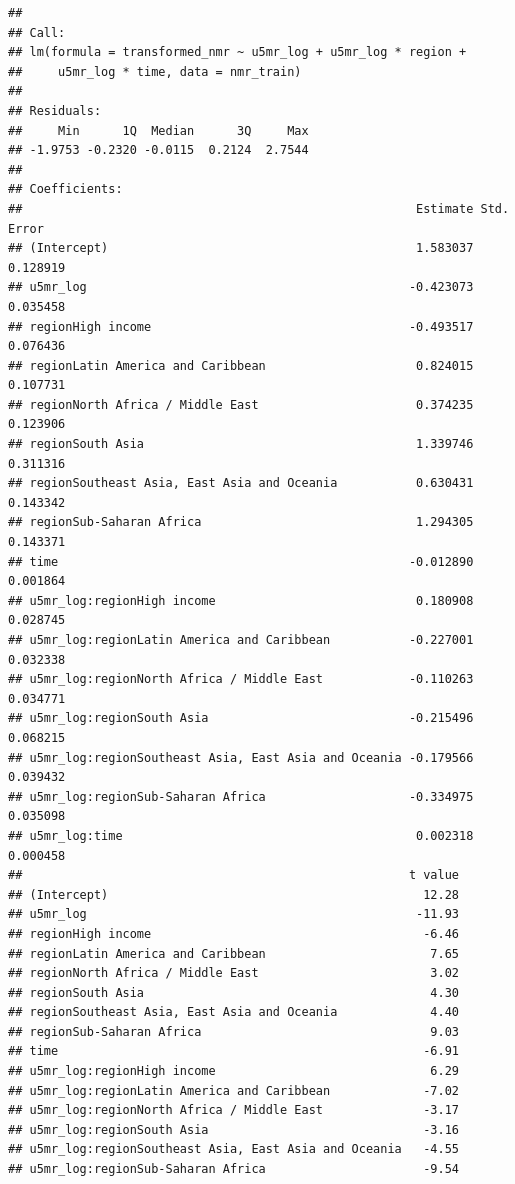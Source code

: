 \documentclass[
]{article}
\begin{document}
\begin{verbatim}
## 
## Call:
## lm(formula = transformed_nmr ~ u5mr_log + u5mr_log * region + 
##     u5mr_log * time, data = nmr_train)
## 
## Residuals:
##     Min      1Q  Median      3Q     Max 
## -1.9753 -0.2320 -0.0115  0.2124  2.7544 
## 
## Coefficients:
##                                                       Estimate Std. Error
## (Intercept)                                           1.583037   0.128919
## u5mr_log                                             -0.423073   0.035458
## regionHigh income                                    -0.493517   0.076436
## regionLatin America and Caribbean                     0.824015   0.107731
## regionNorth Africa / Middle East                      0.374235   0.123906
## regionSouth Asia                                      1.339746   0.311316
## regionSoutheast Asia, East Asia and Oceania           0.630431   0.143342
## regionSub-Saharan Africa                              1.294305   0.143371
## time                                                 -0.012890   0.001864
## u5mr_log:regionHigh income                            0.180908   0.028745
## u5mr_log:regionLatin America and Caribbean           -0.227001   0.032338
## u5mr_log:regionNorth Africa / Middle East            -0.110263   0.034771
## u5mr_log:regionSouth Asia                            -0.215496   0.068215
## u5mr_log:regionSoutheast Asia, East Asia and Oceania -0.179566   0.039432
## u5mr_log:regionSub-Saharan Africa                    -0.334975   0.035098
## u5mr_log:time                                         0.002318   0.000458
##                                                      t value
## (Intercept)                                            12.28
## u5mr_log                                              -11.93
## regionHigh income                                      -6.46
## regionLatin America and Caribbean                       7.65
## regionNorth Africa / Middle East                        3.02
## regionSouth Asia                                        4.30
## regionSoutheast Asia, East Asia and Oceania             4.40
## regionSub-Saharan Africa                                9.03
## time                                                   -6.91
## u5mr_log:regionHigh income                              6.29
## u5mr_log:regionLatin America and Caribbean             -7.02
## u5mr_log:regionNorth Africa / Middle East              -3.17
## u5mr_log:regionSouth Asia                              -3.16
## u5mr_log:regionSoutheast Asia, East Asia and Oceania   -4.55
## u5mr_log:regionSub-Saharan Africa                      -9.54

\end{verbatim}
\end{document}
